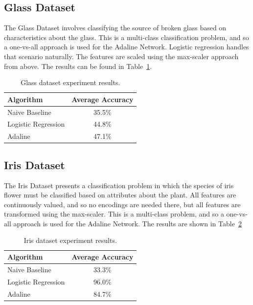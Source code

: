 \documentclass{amsart}
\begin{document}
    \subsection{Glass Dataset}
    The Glass Dataset\cite{glassdataset} involves classifying the source of
    broken glass based on characteristics about the glass. This is a multi-class
    classification problem, and so a one-vs-all approach is used for the
    Adaline Network. Logistic regression handles that scenario naturally.
    The features are scaled using the max-scaler approach from above.
    The results can be found in Table~\ref{glass_results}.
\begin{table}[H]
    \begin{tabular}{lc}
    Algorithm & Average Accuracy \\
    \hline
    Naive Baseline & 35.5\% \\
    Logistic Regression & 44.8\% \\
    Adaline & 47.1\%
    \end{tabular}
    \label{glass_results}
        \caption{Glass dataset experiment results.}
    \end{table}

    \subsection{Iris Dataset}
    The Iris Dataset\cite{irisdataset} presents a classification
    problem in which the species of iris flower must be classified based
    on attributes about the plant. All features are continuously
    valued, and so no encodings are needed there, but all features are transformed
    using the max-scaler. This is a multi-class problem, and so
    a one-vs-all approach is used for the Adaline Network. The results are
    shown in Table~\ref{iris_results}
    \begin{table}[H]
    \begin{tabular}{lc}
    Algorithm & Average Accuracy \\
    \hline
    Naive Baseline & 33.3\% \\
    Logistic Regression & 96.0\% \\
    Adaline & 84.7\%
    \end{tabular}
    \label{iris_results}
        \caption{Iris dataset experiment results.}
    \end{table}
\end{document}
